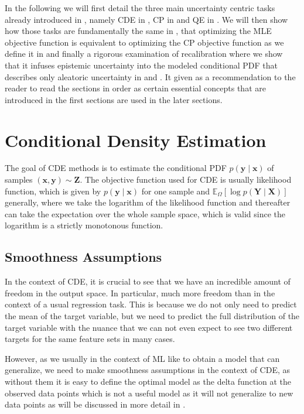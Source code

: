 In the following we will first detail the three main uncertainty centric tasks already introduced in , namely CDE in , CP in  and QE in . We will then show how those tasks are fundamentally the same in , that optimizing the MLE objective function is equivalent to optimizing the CP objective function as we define it in  and finally a rigorous examination of recalibration where we show that it infuses epistemic uncertainty into the modeled conditional PDF that describes only aleatoric uncertainty in  and . It given as a recommendation to the reader to read the sections in order as certain essential concepts that are introduced in the first sections are used in the later sections.

\section{Conditional Density Estimation}\label{sec:cde}

The goal of CDE methods is to estimate the conditional PDF $p(\mathbf{y}\mid \mathbf{x})$ of samples $(\mathbf{x}, \mathbf{y}) \sim \mathbf{Z}$. The objective function used for CDE is usually likelihood function, which is given by $p(\mathbf{y}\mid \mathbf{x})$ for one sample and $\mathbb{E}_{\Omega}\left[\log p(\mathbf{Y} \mid \mathbf{X})\right]$ generally, where we take the logarithm of the likelihood function and thereafter can take the expectation over the whole sample space, which is valid since the logarithm is a strictly monotonous function.

\subsection{Smoothness Assumptions}\label{sec:smoothness}
In the context of CDE, it is crucial to see that we have an incredible amount of freedom in the output space. In particular, much more freedom than in the context of a usual regression task. This is because we do not only need to predict the mean of the target variable, but we need to predict the full distribution of the target variable with the nuance that we can not even expect to see two different targets for the same feature sets in many cases.

However, as we usually in the context of ML like to obtain a model that can generalize, we need to make smoothness assumptions in the context of CDE, as without them it is easy to define the optimal model as the delta function at the observed data points which is not a useful model as it will not generalize to new data points as will be discussed in more detail in .

